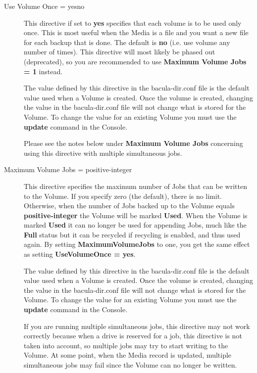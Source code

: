 \begin{description}
\item [Use Volume Once = \lt{}yes\vb{}no\gt{}]
   This directive if set to {\bf yes} specifies that each volume is to be
   used only once.  This is most useful when the Media is a file and you
   want a new file for each backup that is done.  The default is {\bf no}
   (i.e.  use volume any number of times).  This directive will most likely
   be phased out (deprecated), so you are recommended to use {\bf Maximum
   Volume Jobs = 1} instead.

   The value defined by this directive in the bacula-dir.conf file is the
   default value used when a Volume is created.  Once the volume is
   created, changing the value in the bacula-dir.conf file will not change
   what is stored for the Volume.  To change the value for an existing
   Volume you must use the {\bf update} command in the Console.

   Please see the notes below under {\bf Maximum Volume Jobs} concerning
   using this directive with multiple simultaneous jobs.

\item [Maximum Volume Jobs = \lt{}positive-integer\gt{}]
   This directive specifies the maximum number of Jobs that can be written
   to the Volume.  If you specify zero (the default), there is no limit.
   Otherwise, when the number of Jobs backed up to the Volume equals {\bf
   positive-integer} the Volume will be marked {\bf Used}.  When the Volume
   is marked {\bf Used} it can no longer be used for appending Jobs, much
   like the {\bf Full} status but it can be recycled if recycling is
   enabled, and thus used again.  By setting {\bf MaximumVolumeJobs} to
   one, you get the same effect as setting {\bf UseVolumeOnce = yes}.

   The value defined by this directive in the  bacula-dir.conf
   file is the default value used when a Volume  is created. Once the volume is
   created, changing the value  in the bacula-dir.conf file will not change what
   is stored  for the Volume. To change the value for an existing Volume  you
   must use the {\bf update} command in the Console.  

   If you are running multiple simultaneous jobs, this directive may not
   work correctly because when a drive is reserved for a job, this
   directive is not taken into account, so multiple jobs may try to 
   start writing to the Volume. At some point, when the Media record is
   updated, multiple simultaneous jobs may fail since the Volume can no
   longer be written.


\end{description}
